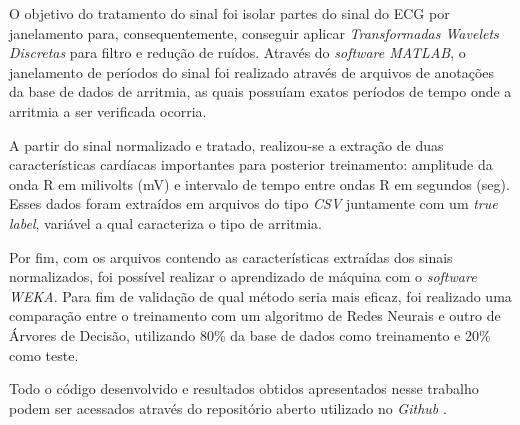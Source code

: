 \documentclass[conference]{IEEEtran}
\begin{document}
O objetivo do tratamento do sinal foi isolar partes do sinal do ECG por janelamento para, consequentemente, conseguir aplicar \textit{Transformadas Wavelets Discretas} para filtro e redução de ruídos. Através do \textit{software MATLAB}, o janelamento de períodos do sinal foi realizado através de arquivos de anotações da base de dados de arritmia, as quais possuíam exatos períodos de tempo onde a arritmia a ser verificada ocorria.

A partir do sinal normalizado e tratado, realizou-se a extração de duas características cardíacas importantes para posterior treinamento: amplitude da onda R em milivolts (mV) e intervalo de tempo entre ondas R em segundos (seg). Esses dados foram extraídos em arquivos do tipo \textit{CSV} juntamente com um \textit{true label}, variável a qual caracteriza o tipo de arritmia.

Por fim, com os arquivos contendo as características extraídas dos sinais normalizados, foi possível realizar o aprendizado de máquina com o \textit{software WEKA}. Para fim de validação de qual método seria mais eficaz, foi realizado uma comparação entre o treinamento com um algoritmo de Redes Neurais e outro de Árvores de Decisão, utilizando 80\% da base de dados como treinamento e 20\% como teste.

Todo o código desenvolvido e resultados obtidos apresentados nesse trabalho podem ser acessados através do repositório aberto utilizado no \textit{Github} \cite{kawasaki17}.

%
\end{document}
